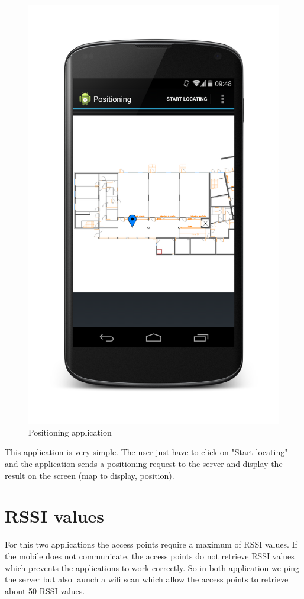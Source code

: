 \begin{figure}[h!]
  	\centering
    \includegraphics[scale=0.1]{./android/Positioning.png}
  \caption{Positioning application}
\end{figure}

This application is very simple. The user just have to click on "Start locating" and the application sends a positioning request to the server and display the result on the screen (map to display, position).


\section{RSSI values}

For this two applications the access points require a maximum of RSSI values. If the mobile does not communicate, the access points do not retrieve RSSI values which prevents the applications to work correctly. So in both application we ping the server but also launch a wifi scan which allow the access points to retrieve about 50 RSSI values.

